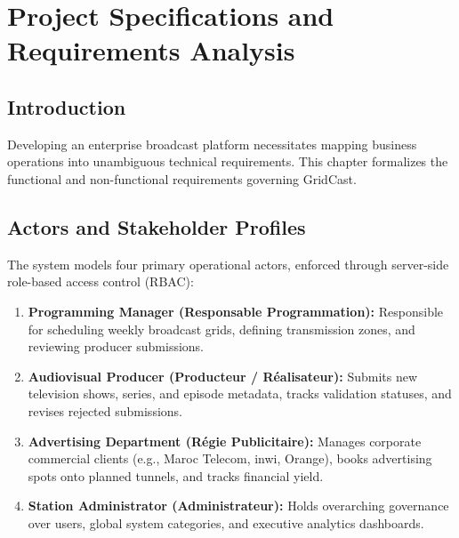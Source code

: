\documentclass[12pt,a4paper,oneside]{report}
\begin{document}
\chapter{Project Specifications and Requirements Analysis}
\label{chap:specs}

\section{Introduction}
Developing an enterprise broadcast platform necessitates mapping business operations into unambiguous technical requirements. This chapter formalizes the functional and non-functional requirements governing GridCast.

\section{Actors and Stakeholder Profiles}
The system models four primary operational actors, enforced through server-side role-based access control (RBAC):
\begin{enumerate}
    \item \textbf{Programming Manager (Responsable Programmation):} Responsible for scheduling weekly broadcast grids, defining transmission zones, and reviewing producer submissions.
    \item \textbf{Audiovisual Producer (Producteur / Réalisateur):} Submits new television shows, series, and episode metadata, tracks validation statuses, and revises rejected submissions.
    \item \textbf{Advertising Department (Régie Publicitaire):} Manages corporate commercial clients (e.g., Maroc Telecom, inwi, Orange), books advertising spots onto planned tunnels, and tracks financial yield.
    \item \textbf{Station Administrator (Administrateur):} Holds overarching governance over users, global system categories, and executive analytics dashboards.
\end{enumerate}
\end{document}
